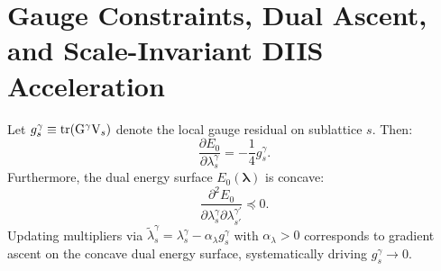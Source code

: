 \section{Gauge Constraints, Dual Ascent, and Scale-Invariant DIIS Acceleration}
\label{sec:m1_3_diis_solver}
\begin{lemma}
\label{lem:m1_3_hf_gradient}
Let $g_s^\gamma \equiv \operatorname{tr}(\mathrm{G}^\gamma \mathrm{V}_s)$ denote the local gauge residual on sublattice $s$. Then:
\begin{equation}
\label{eq:m1_3_hf_multiplier_gradient}
\frac{\partial E_0}{\partial \lambda_s^\gamma} = -\frac{1}{4} g_s^\gamma.
\end{equation}
Furthermore, the dual energy surface $E_0(\boldsymbol{\lambda})$ is concave:
\begin{equation}
\label{eq:m1_3_dual_hessian_concavity}
\frac{\partial^2 E_0}{\partial \lambda_s^\gamma \partial \lambda_{s'}^{\gamma'}} \preceq 0.
\end{equation}
Updating multipliers via $\tilde{\lambda}_s^\gamma = \lambda_s^\gamma - \alpha_\lambda g_s^\gamma$ with $\alpha_\lambda > 0$ corresponds to gradient ascent on the concave dual energy surface, systematically driving $g_s^\gamma \to 0$.
\end{lemma}

